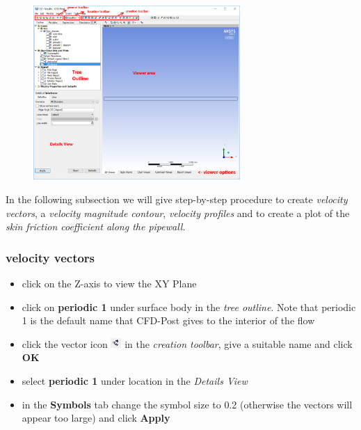 \documentclass[11pt,a4paper,oneside,hidelinks]{scrartcl}
\newcommand\bfr[1]{\textcolor[rgb]{1,0.00,0.00}{\textbf{\textsf{#1}}}}
\begin{document}
\begin{figure}[H]
\begin{center}
\includegraphics[width=0.7\textwidth,clip]{CFDPost_GUI.png}
\end{center}
\end{figure}

In the following subsection we will give step-by-step procedure to create \emph{velocity vectors}, a \emph{velocity magnitude contour}, \emph{velocity profiles} and to create a plot of the \emph{skin friction coefficient along the pipewall}.

\subsubsection{velocity vectors}

\begin{itemize}
\item click on the Z-axis to view the XY Plane
\item click on \bfr{periodic 1} under surface body in the \emph{tree outline}. Note that periodic 1 is the default name that CFD-Post gives to the interior of the flow
\item click the vector icon \includegraphics[width=0.4cm]{vector_icon.png} in the \emph{creation toolbar}, give a suitable name and click \bfr{OK}
\item select \bfr{periodic 1}  under location in the \emph{Details View}
\item in the \bfr{Symbols} tab change the symbol size to 0.2 (otherwise the vectors will appear too large) and click \bfr{Apply}
\end{itemize}
\end{document}
